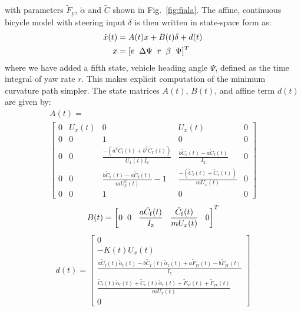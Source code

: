 \documentclass[twocolumn,10pt]{asme2ej}
\begin{document}
with parameters $\tilde{F}_\mathrm{y}$, $\tilde{\alpha}$ and $\tilde{C}$ shown in Fig.~\ref{fig:fiala}. The affine, continuous bicycle model with
steering input $\delta$ is then written in state-space form as:
\begin{subequations}
\label{eq:cts}
\begin{align}
	\dot{x}(t) &= A(t) x + B(t)\delta + d(t)\\
	 x &= [e \hspace{2mm} \Delta\Psi \hspace{2mm} r \hspace{2mm} \beta \hspace{2mm} \Psi]^T
\end{align}
\end{subequations}
where we have added a fifth state, vehicle heading angle $\Psi$, defined as the time integral of yaw rate $r$.
 This makes explicit computation of the minimum curvature path simpler. The state matrices $A(t)$, $B(t)$, and affine term $d(t)$ 
 are given by:
\begin{multline}
\label{eqn:Amatrix}
A(t)  =  \\
\left[\begin{matrix}
  0 & U_x(t) & 0 & U_x(t) & 0\\ 
  0 & 0 & 1 & 0 & 0 \\ 
  0 & 0  & \frac{-(a^2\tilde{C}_\mathrm{f}(t)+b^2\tilde{C}_\mathrm{r}(t))}{U_x(t)I_\mathrm{z}} & \frac{b\tilde{C}_\mathrm{r}(t) - a\tilde{C}_\mathrm{f}(t)}{I_\mathrm{z}} & 0 \\
  0 & 0  & \frac{b\tilde{C}_\mathrm{r}(t)-a\tilde{C}_\mathrm{f}(t)}{mU_x^2(t)}-1 & \frac{-(\tilde{C}_\mathrm{f}(t) + \tilde{C}_\mathrm{r}(t))}{mU_x(t)} & 0 \\
  0 & 0 & 1 & 0 & 0
 \end{matrix}\right]
 \end{multline}
\begin{align}
B(t) =\left[0 \hspace{2 mm} 0 \hspace{3 mm} \frac{a \tilde{C}_\mathrm{f}(t)}{I_\mathrm{z}} \hspace{3 mm}  \frac{\tilde{C}_\mathrm{f}(t)}{mU_x(t)} \hspace{3mm} 0\right]^T
\end {align}
\begin{align}
\label{eqn:Dmatrix}
d(t) = \left[\begin{matrix} 0 \\
               -K(t) U_x(t) \\ 
			    \frac{a\tilde{C}_\mathrm{f}(t)\tilde{\alpha}_\mathrm{f}(t) - b\tilde{C}_\mathrm{r}(t)\tilde{\alpha}_\mathrm{r}(t) + a\tilde{F}_\mathrm{yf}(t) - b\tilde{F}_\mathrm{yr}(t)}{I_z} \\
				\frac{\tilde{C}_\mathrm{f}(t)\tilde{\alpha}_\mathrm{f}(t) + \tilde{C}_\mathrm{r}(t)\tilde{\alpha}_\mathrm{r}(t) + \tilde{F}_\mathrm{yf}(t) + \tilde{F}_\mathrm{yr}(t)}{mU_x(t)}\\
				0
				\end{matrix}\right]
\end{align}
\end{document}
